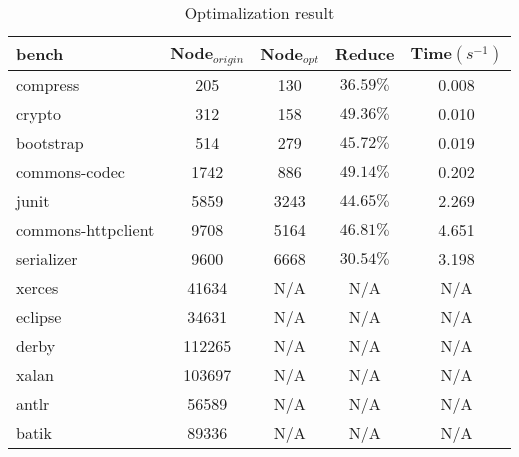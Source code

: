 \documentclass{llncs}
\begin{document}
\begin{table}[!htbp]\centering
\caption{Optimalization result}
\begin{tabular}{lcccc}
	\hline
	\textbf{bench} & \textbf{Node$_{origin}$} & \textbf{Node$_{opt}$} & \textbf{Reduce} & \textbf{Time$(s^{-1})$} \\
	\hline
	compress & 205 & 130 & $36.59\%$ & 0.008 \\
	crypto & 312 & 158 & $49.36\%$ & 0.010 \\
	bootstrap & 514 & 279 & $45.72\%$ & 0.019 \\
	commons-codec & 1742 & 886 & $49.14\%$ & 0.202 \\
	junit & 5859 & 3243 & $44.65\%$ & 2.269 \\
	commons-httpclient & 9708 & 5164 & $46.81\%$ & 4.651 \\
	serializer & 9600 & 6668 & $30.54\%$ & 3.198 \\
	xerces & 41634 & N/A & N/A & N/A\\
	eclipse & 34631 & N/A & N/A & N/A\\
	derby & 112265 & N/A & N/A & N/A\\
	xalan & 103697 & N/A & N/A & N/A\\
	antlr & 56589 & N/A & N/A & N/A\\
	batik & 89336 & N/A & N/A & N/A\\
	\hline
\end{tabular}
\label{experiment:Optimalization}
\end{table}



\end{document}
